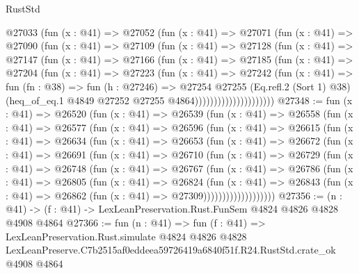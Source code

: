 \begin{lexlean}{RustStd}
\begin{coremodule}
                  @27033
                    (fun (x : @41) =>
                    @27052
                      (fun (x : @41) =>
                      @27071
                        (fun (x : @41) =>
                        @27090
                          (fun (x : @41) =>
                          @27109
                            (fun (x : @41) =>
                            @27128
                              (fun (x : @41) =>
                              @27147
                                (fun (x : @41) =>
                                @27166
                                  (fun (x : @41) =>
                                  @27185
                                    (fun (x : @41) =>
                                    @27204
                                      (fun (x : @41) =>
                                      @27223
                                        (fun (x : @41) =>
                                        @27242
                                          (fun (x : @41) =>
                                          fun (fn : @38) =>
                                          fun (h : @27246) =>
                                          @27254
                                            @27255
                                            (Eq.refl.{2} (Sort 1) @38)
                                            (heq_of_eq.{1}
                                              @4849
                                              @27252
                                              @27255
                                              @4864)))))))))))))))))))))
@27348 := fun (x : @41) =>
  @26520
    (fun (x : @41) =>
    @26539
      (fun (x : @41) =>
      @26558
        (fun (x : @41) =>
        @26577
          (fun (x : @41) =>
          @26596
            (fun (x : @41) =>
            @26615
              (fun (x : @41) =>
              @26634
                (fun (x : @41) =>
                @26653
                  (fun (x : @41) =>
                  @26672
                    (fun (x : @41) =>
                    @26691
                      (fun (x : @41) =>
                      @26710
                        (fun (x : @41) =>
                        @26729
                          (fun (x : @41) =>
                          @26748
                            (fun (x : @41) =>
                            @26767
                              (fun (x : @41) =>
                              @26786
                                (fun (x : @41) =>
                                @26805
                                  (fun (x : @41) =>
                                  @26824
                                    (fun (x : @41) =>
                                    @26843
                                      (fun (x : @41) =>
                                      @26862 (fun (x : @41) => @27309)))))))))))))))))))
@27356 := (n : @41) -> (f : @41) -> LexLeanPreservation.Rust.FunSem @4824 @4826 @4828 @4908 @4864
@27366 := fun (n : @41) =>
  fun (f : @41) =>
  LexLeanPreservation.Rust.simulate
    @4824
    @4826
    @4828
    LexLeanPreserve.C7b2515af0eddeea59726419a6840f51f.R24.RustStd.crate_ok
    @4908
    @4864
\end{coremodule}
\end{lexlean}
